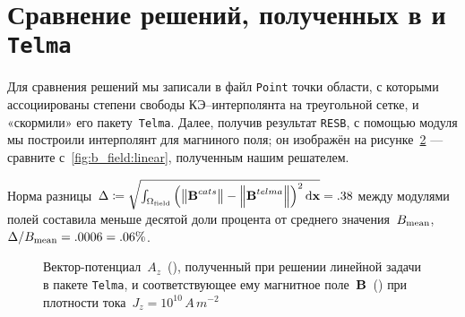 \vfill

\clearpage

\section{Сравнение решений, полученных в \catspdes{} и \texttt{Telma}}

Для сравнения решений мы записали в файл \texttt{Point} точки области, с которыми ассоциированы степени свободы КЭ--интерполянта на треугольной сетке, и «скормили» его пакету~\texttt{Telma}. Далее, получив результат \texttt{RESB}, с помощью модуля  мы построили интерполянт для магниного поля; он изображён на рисунке~\ref{fig:telma:b} --- сравните с~\ref{fig:b_field:linear}, полученным нашим решателем. 

Норма разницы~$\Delta \coloneqq \sqrt{\int_{\Omega_{\text{field}}} \left( \norm{\boldsymbol{\mathbf{B}}^{cats}} - \norm{\boldsymbol{\mathbf{B}}^{telma}} \right)^2 \mathop{}\!\mathrm{d}{\boldsymbol{\mathbf{x}}}} = .38$ между модулями полей составила меньше десятой доли процента от среднего значения~${B_{\text{mean}}}$, $\Delta / {B_{\text{mean}}} = .0006 = .06\%$.

\vfill

\begin{figure}[h]
	\centering
	\begin{subfigure}{.4\linewidth}
		\centering
		\caption{}
		\label{fig:telma:a}
	\end{subfigure}%
	\hfill
	\begin{subfigure}{.45\linewidth}
		\centering
		\caption{}
		\label{fig:telma:b}
	\end{subfigure}
	\caption[Вектор-потенциал~$A_z$, полученный при решении линейной задачи в пакете \texttt{Telma}, и соответствующее ему магнитное поле~$\vect B$]{
		Вектор-потенциал~$A_z$~(), полученный при решении линейной задачи в пакете \texttt{Telma}, и соответствующее ему магнитное поле~$\vect B$~() при плотности тока~$J_z = 10^{10}\,A\,m^{-2}$
	}
	\label{fig:telma}
\end{figure}

\vfill